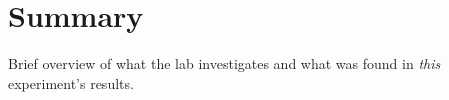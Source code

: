 \section{Summary}\label{sec:summary}
Brief overview of what the lab investigates and what was found in \textit{this} experiment's results.

